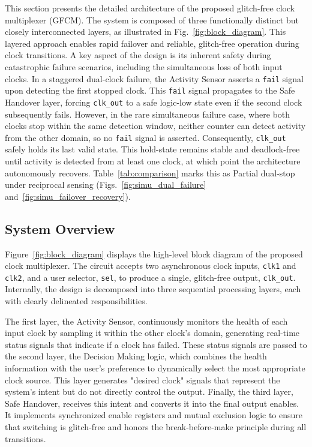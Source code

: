 \documentclass[conference]{IEEEtran}
\begin{document}
This section presents the detailed architecture of the proposed glitch-free clock multiplexer (GFCM). The system is composed of three functionally distinct but closely interconnected layers, as illustrated in Fig.~\ref{fig:block_diagram}. This layered approach enables rapid failover and reliable, glitch-free operation during clock transitions. A key aspect of the design is its inherent safety during catastrophic failure scenarios, including the simultaneous loss of both input clocks. In a staggered dual-clock failure, the Activity Sensor asserts a \texttt{fail} signal upon detecting the first stopped clock. This \texttt{fail} signal propagates to the Safe Handover layer, forcing \texttt{clk\_out} to a safe logic-low state even if the second clock subsequently fails. However, in the rare simultaneous failure case, where both clocks stop within the same detection window, neither counter can detect activity from the other domain, so no \texttt{fail} signal is asserted. Consequently, \texttt{clk\_out} safely holds its last valid state. This hold-state remains stable and deadlock-free until activity is detected from at least one clock, at which point the architecture autonomously recovers. Table~\ref{tab:comparison} marks this as Partial dual-stop under reciprocal sensing (Figs.~\ref{fig:simu_dual_failure} and~\ref{fig:simu_failover_recovery}).


\subsection{System Overview}

Figure~\ref{fig:block_diagram} displays the high-level block diagram of the proposed clock multiplexer. The circuit accepts two asynchronous clock inputs, \texttt{clk1} and \texttt{clk2}, and a user selector, \texttt{sel}, to produce a single, glitch-free output, \texttt{clk\_out}. Internally, the design is decomposed into three sequential processing layers, each with clearly delineated responsibilities.

The first layer, the Activity Sensor, continuously monitors the health of each input clock by sampling it within the other clock's domain, generating real-time status signals that indicate if a clock has failed. These status signals are passed to the second layer, the Decision Making logic, which combines the health information with the user's preference to dynamically select the most appropriate clock source. This layer generates "desired clock" signals that represent the system's intent but do not directly control the output. Finally, the third layer, Safe Handover, receives this intent and converts it into the final output enables. It implements synchronized enable registers and mutual exclusion logic to ensure that switching is glitch-free and honors the break-before-make principle during all transitions.
\end{document}
